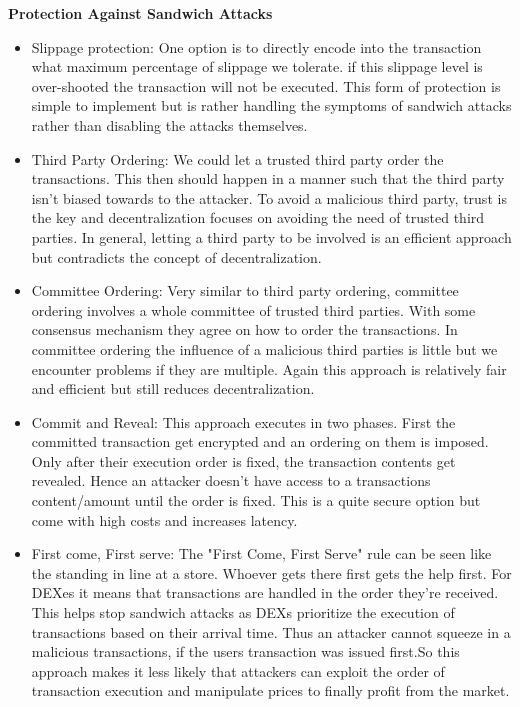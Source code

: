 \documentclass{article}
\begin{document}
\textbf{Protection Against Sandwich Attacks}

\begin{itemize}
\item {Slippage protection}: One option is to directly encode into the transaction what maximum percentage of slippage we tolerate. if this slippage level is over-shooted the transaction will not be executed. This form of protection is simple to implement but is rather handling the symptoms of sandwich attacks rather than disabling  the attacks themselves.
\item {Third Party Ordering}: We could let a trusted third party order the transactions. This then should happen in a manner such that the third party isn't biased towards to the attacker. To avoid a malicious third party, trust is the key and decentralization focuses on avoiding the need of trusted third parties. In general, letting a third party to be involved is an efficient approach but contradicts the concept of decentralization.
\item {Committee Ordering}: Very similar to third party ordering, committee ordering involves  a whole committee of trusted third parties. With some consensus mechanism they agree on how to order the transactions. In committee ordering the influence of a malicious third parties is little but we encounter problems if they are multiple. Again this approach is relatively fair and efficient but still reduces decentralization.
\item {Commit and Reveal}: This approach executes in two phases. First the committed transaction get encrypted and an ordering on them is imposed. Only after their execution order is fixed, the transaction contents get revealed. Hence an attacker doesn't have access to a transactions content/amount until the order is fixed. This is a quite secure option but come with high costs and increases latency.
\item {First come, First serve}:
The "First Come, First Serve" rule can be seen like the standing in line at a store. Whoever gets there first gets the help first. For DEXes it means that transactions are handled in the order they're received. This helps stop sandwich attacks as DEXs prioritize the execution of transactions based on their arrival time. Thus an attacker cannot squeeze in a malicious transactions, if the users transaction was issued first.So this approach makes it less likely that attackers can exploit the order of transaction execution and manipulate prices to finally profit from the market.
\end{itemize}
\end{document}

